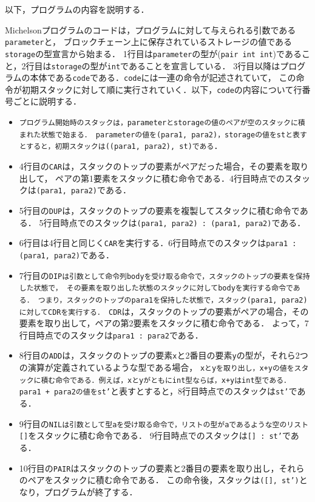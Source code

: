 \documentclass{kuisthesis}
\begin{document}
以下，プログラムの内容を説明する．

Michelsonプログラムのコードは，プログラムに対して与えられる引数である{\tt parameter}と，
ブロックチェーン上に保存されているストレージの値である{\tt storage}の型宣言から始まる．
1行目は{\tt parameter}の型が({\tt pair int int})であること，2行目は{\tt storage}の型が{\tt int}であることを宣言している．
3行目以降はプログラムの本体である{\tt code}である．{\tt code}には一連の命令が記述されていて，
この命令が初期スタックに対して順に実行されていく．以下，{\tt code}の内容について行番号ごとに説明する．

\begin{itemize}
  \item {\tt プログラム開始時のスタックは，parameterとstorageの値のペアが空のスタックに積まれた状態で始まる．
  parameterの値を(para1, para2)，storageの値をstと表すとすると，初期スタックは((para1, para2), st)である}．
  \item 4行目の{\tt CAR}は，スタックのトップの要素がペアだった場合，その要素を取り出して，
  ペアの第1要素をスタックに積む命令である．4行目時点でのスタックは{\tt (para1, para2)}である．
  \item 5行目の{\tt DUP}は，スタックのトップの要素を複製してスタックに積む命令である．
  5行目時点でのスタックは{\tt (para1, para2) : (para1, para2)}である．
  \item 6行目は4行目と同じく{\tt CAR}を実行する．6行目時点でのスタックは{\tt para1 : (para1, para2)}である．
  \item 7行目の{\tt DIPは引数として命令列bodyを受け取る命令で，スタックのトップの要素を保持した状態で，
  その要素を取り出した状態のスタックに対してbodyを実行する命令である．
  つまり，スタックのトップのpara1を保持した状態で，スタック(para1, para2)に対してCDRを実行する．
  CDR}は，スタックのトップの要素がペアの場合，その要素を取り出して，ペアの第2要素をスタックに積む命令である．
  よって，7行目時点でのスタックは{\tt para1 : para2}である．
  \item 8行目の{\tt ADD}は，スタックのトップの要素{\tt x}と2番目の要素{\tt y}の型が，それら2つの演算が定義されているような型である場合，
  {\tt xとyを取り出し，x+yの値をスタックに積む命令である．例えば，xとyがともにint型ならば，x+yはint型である．
  para1 + para2の値をst'}と表すとすると，8行目時点でのスタックは{\tt st'}である．
  \item 9行目の{\tt NILは引数として型aを受け取る命令で，リストの型がaであるような空のリスト[]}をスタックに積む命令である．
  9行目時点でのスタックは{\tt [] : st'}である．
  \item 10行目の{\tt PAIR}はスタックのトップの要素と2番目の要素を取り出し，それらのペアをスタックに積む命令である．
  この命令後，スタックは{\tt ([], st')}となり，プログラムが終了する．
\end{itemize}
\end{document}
